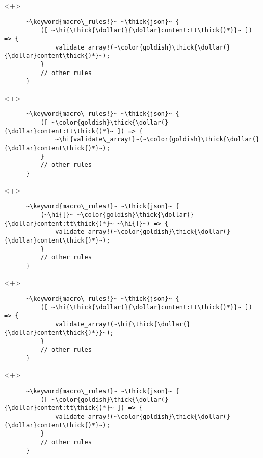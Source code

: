 \documentclass[usepdftitle=false]{beamer}
\newcommand{\dollar}{\makebox[\widthof{\$}][c]{\$}}
\newcommand{\thick}[1]{\contourlength{0.16pt}\contour[10]{black}{#1}}
\newcommand{\hi}[1]{%
\tikz[baseline=(A.base)]
 \node[highlighting=yellowbg,inner sep=0pt,text depth=0pt] (A) {#1};%
}
\newcommand{\keyword}[1]{\color{greenish}#1}
\begin{document}
\begin{frame}[fragile]
  \begin{onlyenv}<+>
    \begin{verbatim}
      ~\keyword{macro\_rules!}~ ~\thick{json}~ {
          ([ ~\hi{\thick{\dollar(}{\dollar}content:tt\thick{)*}}~ ]) => {
              validate_array!(~\color{goldish}\thick{\dollar(}{\dollar}content\thick{)*}~);
          }
          // other rules
      }
    \end{verbatim}
  \end{onlyenv}
  \begin{onlyenv}<+>
    \begin{verbatim}
      ~\keyword{macro\_rules!}~ ~\thick{json}~ {
          ([ ~\color{goldish}\thick{\dollar(}{\dollar}content:tt\thick{)*}~ ]) => {
              ~\hi{validate\_array!}~(~\color{goldish}\thick{\dollar(}{\dollar}content\thick{)*}~);
          }
          // other rules
      }
    \end{verbatim}
  \end{onlyenv}
  \begin{onlyenv}<+>
    \begin{verbatim}
      ~\keyword{macro\_rules!}~ ~\thick{json}~ {
          (~\hi{[}~ ~\color{goldish}\thick{\dollar(}{\dollar}content:tt\thick{)*}~ ~\hi{]}~) => {
              validate_array!(~\color{goldish}\thick{\dollar(}{\dollar}content\thick{)*}~);
          }
          // other rules
      }
    \end{verbatim}
  \end{onlyenv}
  \begin{onlyenv}<+>
    \begin{verbatim}
      ~\keyword{macro\_rules!}~ ~\thick{json}~ {
          ([ ~\hi{\thick{\dollar(}{\dollar}content:tt\thick{)*}}~ ]) => {
              validate_array!(~\hi{\thick{\dollar(}{\dollar}content\thick{)*}}~);
          }
          // other rules
      }
    \end{verbatim}
  \end{onlyenv}
  \begin{onlyenv}<+>
    \begin{verbatim}
      ~\keyword{macro\_rules!}~ ~\thick{json}~ {
          ([ ~\color{goldish}\thick{\dollar(}{\dollar}content:tt\thick{)*}~ ]) => {
              validate_array!(~\color{goldish}\thick{\dollar(}{\dollar}content\thick{)*}~);
          }
          // other rules
      }
    \end{verbatim}
  \end{onlyenv}
\end{frame}
\end{document}
